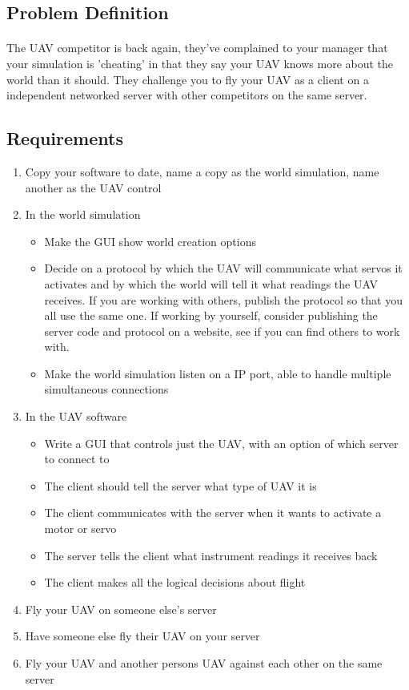 \documentclass[11pt]{book}
\begin{document}
\subsection{Problem Definition}

\paragraph{} The UAV competitor is back again, they've complained to your
manager that your simulation is 'cheating' in that they say your UAV knows
more about the world than it should. They challenge you to fly your UAV as a
client on a independent networked server with other competitors on the same
server.

\subsection{Requirements}

\begin{enumerate}
\item Copy your software to date, name a copy as the world simulation, name another as the UAV control
\item In the world simulation 
    \begin{itemize}
        \item Make the GUI show world creation options
        \item Decide on a protocol by which the UAV will communicate what servos it activates and by which the world will tell it what readings the UAV receives. If you are working with others, publish the protocol so that you all use the same one. If working by yourself, consider publishing the server code and protocol on a website, see if you can find others to work with.
        \item Make the world simulation listen on a IP port, able to handle multiple simultaneous connections
    \end{itemize}
\item In the UAV software
    \begin{itemize}
        \item Write a GUI that controls just the UAV, with an option of which server to connect to
        \item The client should tell the server what type of UAV it is
        \item The client communicates with the server when it wants to activate a motor or servo
        \item The server tells the client what instrument readings it receives back
        \item The client makes all the logical decisions about flight
    \end{itemize}
\item Fly your UAV on someone else's server
\item Have someone else fly their UAV on your server
\item Fly your UAV and another persons UAV against each other on the same server
\end{enumerate}
\end{document}

